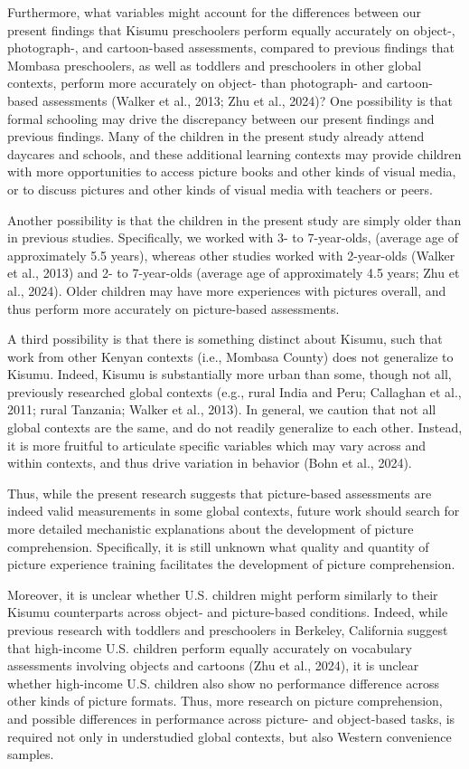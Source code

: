 \documentclass[10pt, letterpaper]{article}
\begin{document}
Furthermore, what variables might account for the differences between
our present findings that Kisumu preschoolers perform equally accurately
on object-, photograph-, and cartoon-based assessments, compared to
previous findings that Mombasa preschoolers, as well as toddlers and
preschoolers in other global contexts, perform more accurately on
object- than photograph- and cartoon-based assessments (Walker et al.,
2013; Zhu et al., 2024)? One possibility is that formal schooling may
drive the discrepancy between our present findings and previous
findings. Many of the children in the present study already attend
daycares and schools, and these additional learning contexts may provide
children with more opportunities to access picture books and other kinds
of visual media, or to discuss pictures and other kinds of visual media
with teachers or peers.

Another possibility is that the children in the present study are simply
older than in previous studies. Specifically, we worked with 3- to
7-year-olds, (average age of approximately 5.5 years), whereas other
studies worked with 2-year-olds (Walker et al., 2013) and 2- to
7-year-olds (average age of approximately 4.5 years; Zhu et al., 2024).
Older children may have more experiences with pictures overall, and thus
perform more accurately on picture-based assessments.

A third possibility is that there is something distinct about Kisumu,
such that work from other Kenyan contexts (i.e., Mombasa County) does
not generalize to Kisumu. Indeed, Kisumu is substantially more urban
than some, though not all, previously researched global contexts (e.g.,
rural India and Peru; Callaghan et al., 2011; rural Tanzania; Walker et
al., 2013). In general, we caution that not all global contexts are the
same, and do not readily generalize to each other. Instead, it is more
fruitful to articulate specific variables which may vary across and
within contexts, and thus drive variation in behavior (Bohn et al.,
2024).

Thus, while the present research suggests that picture-based assessments
are indeed valid measurements in some global contexts, future work
should search for more detailed mechanistic explanations about the
development of picture comprehension. Specifically, it is still unknown
what quality and quantity of picture experience training facilitates the
development of picture comprehension.

Moreover, it is unclear whether U.S. children might perform similarly to
their Kisumu counterparts across object- and picture-based conditions.
Indeed, while previous research with toddlers and preschoolers in
Berkeley, California suggest that high-income U.S. children perform
equally accurately on vocabulary assessments involving objects and
cartoons (Zhu et al., 2024), it is unclear whether high-income U.S.
children also show no performance difference across other kinds of
picture formats. Thus, more research on picture comprehension, and
possible differences in performance across picture- and object-based
tasks, is required not only in understudied global contexts, but also
Western convenience samples.
\end{document}
